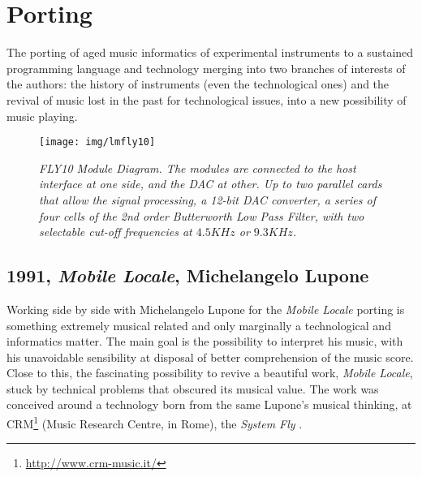 \documentclass[twoside,a4paper]{article}
\begin{document}


\section{Porting}
\label{sec:porting}

The porting of aged music informatics of experimental instruments to a sustained
programming language and technology merging into two branches of interests of the
authors: the history of instruments (even the technological ones) and the revival
of music lost in the past for technological issues, into a new possibility of
music playing.

\begin{figure}[ht]
\centerline{\texttt{[image: img/lmfly10]}}
\caption{\label{ml-fly10}{\it \emph{FLY10} Module Diagram. The modules are
connected to the host interface at one side, and the DAC at other. Up to two
parallel cards that allow the signal processing, a 12-bit DAC converter, a series
of four cells of the 2nd order Butterworth Low Pass Filter, with two selectable
cut-off frequencies at $4.5KHz$ or $9.3KHz$.
}}
\end{figure}

\subsection{1991, \emph{Mobile Locale}, Michelangelo Lupone}

Working side by side with Michelangelo Lupone for the \emph{Mobile Locale}
\cite{lmml91} porting is something extremely musical related and only marginally
a technological and informatics matter. The main goal is the possibility to
interpret his music, with his unavoidable sensibility at disposal of better
comprehension of the music score. Close to this, the fascinating possibility to
revive a beautiful work, \emph{Mobile Locale}, stuck by technical problems that
obscured its musical value. The work was conceived around a technology born from
the same Lupone's musical thinking, at CRM\footnote{\url{http://www.crm-music.it/}}
(Music Research Centre, in Rome), the \emph{System Fly} \cite{ml85}.
\end{document}
